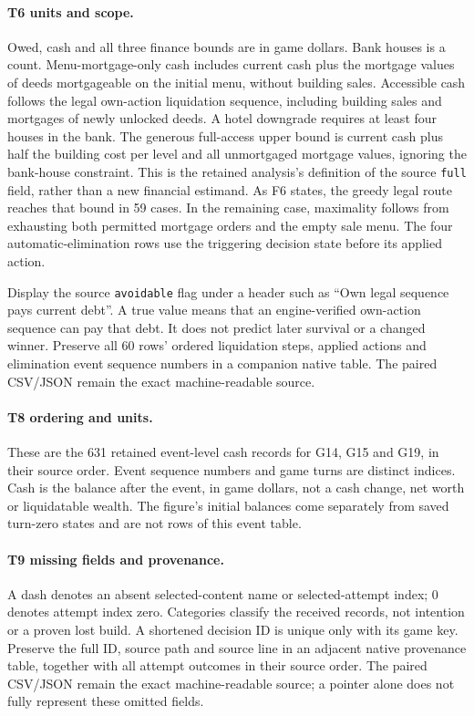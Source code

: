 \paragraph{T6 units and scope.}
Owed, cash and all three finance bounds are in game dollars. Bank houses is
a count. Menu-mortgage-only cash includes current cash plus the mortgage
values of deeds mortgageable on the initial menu, without building sales.
Accessible cash follows the legal own-action liquidation sequence, including
building sales and mortgages of newly unlocked deeds. A hotel downgrade
requires at least four houses in the bank. The generous full-access upper
bound is current cash plus half the building cost per level and all
unmortgaged mortgage values, ignoring the bank-house constraint. This is the
retained analysis's definition of the source \texttt{full} field, rather than
a new financial estimand. As F6 states, the greedy legal route reaches that
bound in 59 cases. In the remaining case, maximality follows from exhausting
both permitted mortgage orders and the empty sale menu. The four
automatic-elimination rows use the triggering decision state before its
applied action.

Display the source \texttt{avoidable} flag under a header such as ``Own legal
sequence pays current debt''. A true value means that an engine-verified
own-action sequence can pay that debt. It does not predict later survival or
a changed winner. Preserve all 60 rows' ordered liquidation steps, applied
actions and elimination event sequence numbers in a companion native table.
The paired CSV/JSON remain the exact machine-readable source.

\paragraph{T8 ordering and units.}
These are the 631 retained event-level cash records for G14, G15 and G19,
in their source order. Event sequence numbers and game turns are distinct
indices. Cash is the balance after the event, in game dollars, not a cash
change, net worth or liquidatable wealth. The figure's initial balances come
separately from saved turn-zero states and are not rows of this event table.

\paragraph{T9 missing fields and provenance.}
A dash denotes an absent selected-content name or selected-attempt index;
0 denotes attempt index zero. Categories classify the received records,
not intention or a proven lost build. A shortened decision ID is unique only
with its game key. Preserve the full ID, source path and source line in an
adjacent native provenance table, together with all attempt outcomes in
their source order. The paired CSV/JSON remain the exact machine-readable
source; a pointer alone does not fully represent these omitted fields.


